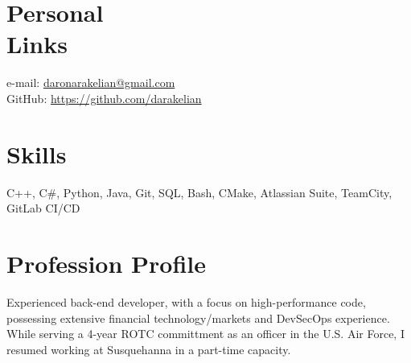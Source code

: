 \documentclass[margin,line]{resume}
\begin{document}
\begin{resume}

    \section{\mysidestyle Personal\\Links}
    \hfill e-mail: \href{mailto://daronarakelian@gmail.com}{daronarakelian@gmail.com} \vspace{0mm}\\\vspace{0mm}%
    \hfill GitHub: \url{https://github.com/darakelian} \vspace{0mm}\\\vspace{-4.5mm}%
    
    \section{\mysidestyle Skills} 
    C++, C\#, Python, Java, Git, SQL, Bash, CMake, Atlassian Suite, TeamCity, GitLab CI/CD

    \section{\mysidestyle Profession Profile}
    Experienced back-end developer, with a focus on high-performance code, possessing extensive financial technology/markets and DevSecOps experience. While serving a 4-year ROTC committment as an officer in the U.S. Air Force, I resumed working at Susquehanna in a part-time capacity.
  

\end{resume}
\end{document}
